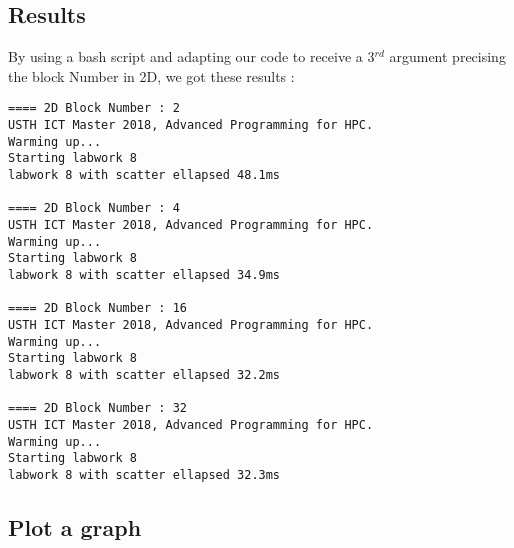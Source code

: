 \documentclass{article}
\begin{document}
\subsection{Results}

    By using a bash script and adapting our code to receive a 3$^{rd}$ argument precising the block Number in 2D, we got these results : 

    \begin{verbatim}
==== 2D Block Number : 2
USTH ICT Master 2018, Advanced Programming for HPC.
Warming up...
Starting labwork 8
labwork 8 with scatter ellapsed 48.1ms

==== 2D Block Number : 4
USTH ICT Master 2018, Advanced Programming for HPC.
Warming up...
Starting labwork 8
labwork 8 with scatter ellapsed 34.9ms

==== 2D Block Number : 16
USTH ICT Master 2018, Advanced Programming for HPC.
Warming up...
Starting labwork 8
labwork 8 with scatter ellapsed 32.2ms

==== 2D Block Number : 32
USTH ICT Master 2018, Advanced Programming for HPC.
Warming up...
Starting labwork 8
labwork 8 with scatter ellapsed 32.3ms

    \end{verbatim}

\subsection{Plot a graph}
    
    \newline
\end{document}
